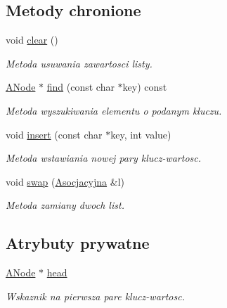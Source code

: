 \subsection*{Metody chronione}
\begin{DoxyCompactItemize}
\item 
void \hyperlink{class_asocjacyjna_a9209f79af7b566f327c8c83f6b879f8b}{clear} ()
\begin{DoxyCompactList}\small\item\em Metoda usuwania zawartosci listy. \end{DoxyCompactList}\item 
\hyperlink{struct_a_node}{A\-Node} $\ast$ \hyperlink{class_asocjacyjna_a98eefccd8a668d6589d35bea37a811a1}{find} (const char $\ast$key) const 
\begin{DoxyCompactList}\small\item\em Metoda wyszukiwania elementu o podanym kluczu. \end{DoxyCompactList}\item 
void \hyperlink{class_asocjacyjna_a0c4f5e81b3998cde7c677c658c949d83}{insert} (const char $\ast$key, int value)
\begin{DoxyCompactList}\small\item\em Metoda wstawiania nowej pary klucz-\/wartosc. \end{DoxyCompactList}\item 
void \hyperlink{class_asocjacyjna_a92d60b9a27bddb7e13ea358db62f684e}{swap} (\hyperlink{class_asocjacyjna}{Asocjacyjna} \&l)
\begin{DoxyCompactList}\small\item\em Metoda zamiany dwoch list. \end{DoxyCompactList}\end{DoxyCompactItemize}
\subsection*{Atrybuty prywatne}
\begin{DoxyCompactItemize}
\item 
\hyperlink{struct_a_node}{A\-Node} $\ast$ \hyperlink{class_asocjacyjna_adf1a2a6a5b0b6254122050bbe8c69046}{head}
\begin{DoxyCompactList}\small\item\em Wskaznik na pierwsza pare klucz-\/wartosc. \end{DoxyCompactList}\end{DoxyCompactItemize}
